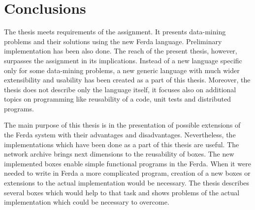 \documentclass[a4paper,12pt]{book}
\begin{document}
\section{Conclusions}

The thesis meets requirements of the assignment. It presents data-mining problems and their solutions using the new Ferda language. Preliminary implementation has been also done. The reach of the present thesis, however, surpasses the assignment in its implications. Instead of a new language specific only for some data-mining problems, a new generic language with much wider extensibility and usability has been created as a part of this thesis. Moreover, the thesis does not describe only the language itself, it focuses also on additional topics on programming like reusability of a code, unit tests and distributed programs. 

The main purpose of this thesis is in the presentation of possible extensions of the Ferda system with their advantages and disadvantages. Nevertheless, the implementations which have been done as a part of this thesis are useful. The network archive brings next dimensions to the reusability of boxes. The new implemented boxes enable simple functional programs in the Ferda. When it were needed to write in Ferda a more complicated program, creation of a new boxes or extensions to the actual implementation would be necessary. The thesis describes several boxes which would help to that task and shows problems of the actual implementation which could be necessary to overcome. 



%
%

%




\end{document}
